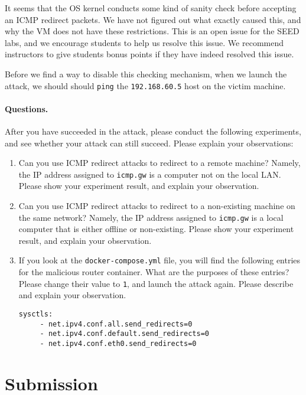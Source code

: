 It seems that the OS kernel conducts some kind of 
sanity check before accepting an ICMP redirect packets. 
We have not figured out what exactly caused this, 
and why the VM does not have these restrictions. 
This is an open issue for the SEED labs, and we encourage 
students to help us resolve this issue. We recommend instructors
to give students bonus points if they have indeed resolved this issue. 


Before we find a way to disable this checking mechanism, 
when we launch the attack,
we should should \texttt{ping} the \texttt{192.168.60.5} host on the 
victim machine. 


\paragraph{Questions.} After you have succeeded in the attack, please 
conduct the following experiments, and see whether your attack can 
still succeed. Please explain your observations:

\begin{enumerate}
\item Can you use ICMP redirect attacks to redirect to a remote machine? Namely,
the IP address assigned to \texttt{icmp.gw} is a computer not on the local LAN. 
Please show your experiment result, and explain your observation.  

\item Can you use ICMP redirect attacks to redirect to a non-existing machine on
the same network? Namely, the IP address assigned to \texttt{icmp.gw} is a local computer that
is either offline or non-existing. 
Please show your experiment result, and explain your observation.  

\item If you look at the \texttt{docker-compose.yml} file, you will find the 
following entries for the malicious router container. What are the purposes
of these entries? Please change their value to \texttt{1}, and launch the attack again. 
Please describe and explain your observation. 

\begin{lstlisting}
sysctls:
     - net.ipv4.conf.all.send_redirects=0
     - net.ipv4.conf.default.send_redirects=0
     - net.ipv4.conf.eth0.send_redirects=0
\end{lstlisting}
 
\end{enumerate}






\section{Submission}








